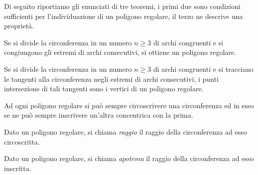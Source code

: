 Di seguito riportiamo gli enunciati di tre teoremi, i primi due sono condizioni 
sufficienti per l'individuazione di un poligono regolare, il terzo ne descrive 
una proprietà.

\begin{teorema}
Se si divide la circonferenza in un numero $n\geq 3$ di archi 
congruenti e si congiungono gli estremi di archi consecutivi, si 
ottiene un poligono regolare.
\end{teorema}


\begin{inaccessibleblock}
 \begin{figure}[!htb]
  \centering
\end{figure}
\end{inaccessibleblock}

\begin{teorema}
Se si divide la circonferenza in un numero $n\geq 3$ di archi 
congruenti e si tracciano le tangenti alla circonferenza negli  
estremi di archi consecutivi, i punti intersezione di tali tangenti 
sono i vertici di un poligono regolare.
\end{teorema}


\begin{inaccessibleblock}
 \begin{figure}[!htb]
  \centering
\end{figure}
\end{inaccessibleblock}


\begin{teorema}\label{teo:poly_reg_circ_inscr_circos}
Ad ogni poligono regolare si può sempre circoscrivere una 
circonferenza ed in esso se ne può sempre inscrivere un'altra 
concentrica con la prima.
\end{teorema}


\begin{inaccessibleblock}
 \begin{figure}[!htb]
  \centering
\end{figure}
\end{inaccessibleblock}


\begin{definizione}
Dato un poligono regolare, si chiama \emph{raggio} il raggio della 
circonferenza ad esso circoscritta.
\end{definizione}

\begin{definizione}
Dato un poligono regolare, si chiama \emph{apotema} il raggio della 
circonferenza ad esso inscritta.
\end{definizione}


% 
% 
% 
% 
